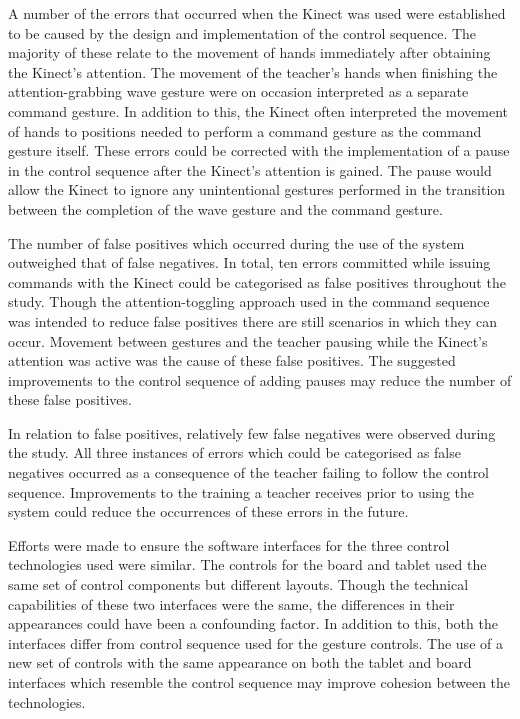 \documentclass[link]{IWCOMP}
\begin{document}
A number of the errors that occurred when the Kinect was used were established to be caused by the design and implementation of the control sequence.
The majority of these relate to the movement of hands immediately after obtaining the Kinect's attention.
The movement of the teacher's hands when finishing the attention-grabbing wave gesture were on occasion interpreted as a separate command gesture.
In addition to this, the Kinect often interpreted the movement of hands to positions needed to perform a command gesture as the command gesture itself.
These errors could be corrected with the implementation of a pause in the control sequence after the Kinect's attention is gained.
The pause would allow the Kinect to ignore any unintentional gestures performed in the transition between the completion of the wave gesture and the command gesture.

The number of false positives which occurred during the use of the system outweighed that of false negatives.
In total, ten errors committed while issuing commands with the Kinect could be categorised as false positives throughout the study.
Though the attention-toggling approach used in the command sequence was intended to reduce false positives there are still scenarios in which they can occur.
Movement between gestures and the teacher pausing while the Kinect's attention was active was the cause of these false positives.
The suggested improvements to the control sequence of adding pauses may reduce the number of these false positives.

In relation to false positives, relatively few false negatives were observed during the study.
All three instances of errors which could be categorised as false negatives occurred as a consequence of the teacher failing to follow the control sequence.
Improvements to the training a teacher receives prior to using the system could reduce the occurrences of these errors in the future.

Efforts were made to ensure the software interfaces for the three control technologies used were similar.
The controls for the board and tablet used the same set of control components but different layouts.
Though the technical capabilities of these two interfaces were the same, the differences in their appearances could have been a confounding factor.
In addition to this, both the interfaces differ from control sequence used for the gesture controls.
The use of a new set of controls with the same appearance on both the tablet and board interfaces which resemble the control sequence may improve cohesion between the technologies.
\end{document}
